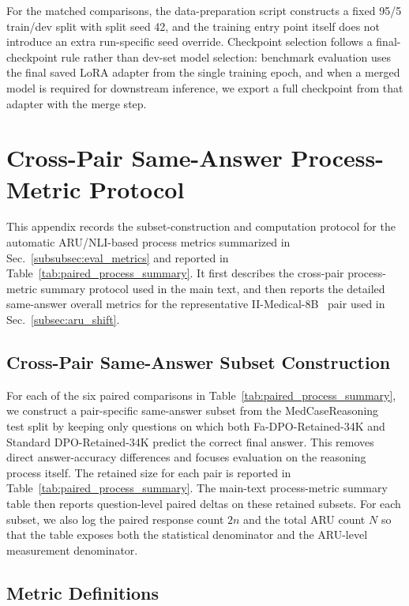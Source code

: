 \documentclass[a4paper,fleqn,doubleblind]{cas-sc}
\begin{document}
For the matched comparisons, the data-preparation script constructs a fixed 95/5 train/dev split with split seed 42, and the training entry point itself does not introduce an extra run-specific seed override. Checkpoint selection follows a final-checkpoint rule rather than dev-set model selection: benchmark evaluation uses the final saved LoRA adapter from the single training epoch, and when a merged model is required for downstream inference, we export a full checkpoint from that adapter with the merge step.

\section{Cross-Pair Same-Answer Process-Metric Protocol}
\label{app:process_metrics}

This appendix records the subset-construction and computation protocol for the automatic ARU/NLI-based process metrics summarized in Sec.~\ref{subsubsec:eval_metrics} and reported in Table~\ref{tab:paired_process_summary}. It first describes the cross-pair process-metric summary protocol used in the main text, and then reports the detailed same-answer overall metrics for the representative II-Medical-8B~\cite{intelligentinternet2025iimedical8b} pair used in Sec.~\ref{subsec:aru_shift}.

\subsection{Cross-Pair Same-Answer Subset Construction}

For each of the six paired comparisons in Table~\ref{tab:paired_process_summary}, we construct a pair-specific same-answer subset from the MedCaseReasoning~\cite{wu2025medcasereasoning} test split by keeping only questions on which both Fa-DPO-Retained-34K and Standard DPO-Retained-34K predict the correct final answer. This removes direct answer-accuracy differences and focuses evaluation on the reasoning process itself. The retained size for each pair is reported in Table~\ref{tab:paired_process_summary}. The main-text process-metric summary table then reports question-level paired deltas on these retained subsets. For each subset, we also log the paired response count $2n$ and the total ARU count $N$ so that the table exposes both the statistical denominator and the ARU-level measurement denominator.

\subsection{Metric Definitions}
\end{document}
